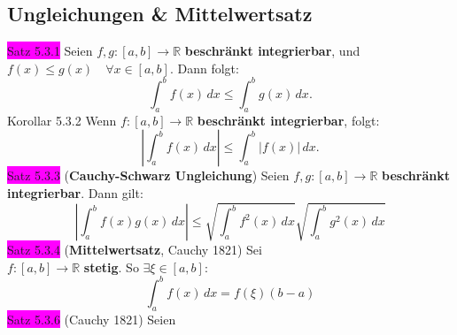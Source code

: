 \documentclass[landscape, 10pt]{article}
\newcommand{\R}{\mathbb{R}}
\begin{document}
\begin{multicols}{3}
       \subsection{Ungleichungen \& Mittelwertsatz}
              \colorbox{magenta}{Satz 5.3.1} 
                     Seien \textcolor{NavyBlue}{
                     $f,g:[a,b]\longrightarrow\R$}
                     \textbf{beschränkt integrierbar}, und 
                     \textcolor{NavyBlue}{
                     $f(x)\leqslant g(x)\quad\forall x\in[a,b]$}.
                     Dann folgt: 
                     \begin{equation*}
                            \int_a^bf(x)\,dx
                            \leqslant\int_a^bg(x)\,dx.
                     \end{equation*}
              \colorbox{BurntOrange}{Korollar 5.3.2} 
                     Wenn \textcolor{NavyBlue}{
                     $f:[a,b]\longrightarrow\R$} 
                     \textbf{beschränkt integrierbar}, folgt:
                     \begin{equation*}
                            |\int_a^bf(x)\,dx|
                            \leqslant\int_a^b|f(x)|\,dx. 
                     \end{equation*}
              \colorbox{magenta}{Satz 5.3.3} 
              (\textbf{Cauchy-Schwarz Ungleichung}) 
                     Seien \textcolor{NavyBlue}{
                     $f,g:[a,b]\longrightarrow\R$}
                     \textbf{beschränkt integrierbar}. 
                     Dann gilt: 
                     \begin{equation*}
                            |\int_a^bf(x)g(x)\,dx|
                            \leqslant\sqrt{\int_a^bf^2(x)\,dx}
                            \sqrt{\int_a^bg^2(x)\,dx}
                     \end{equation*}
              \colorbox{magenta}{Satz 5.3.4} 
              (\textbf{Mittelwertsatz}, Cauchy 1821) 
                     Sei \\ \textcolor{NavyBlue}{
                     $f:[a,b]\longrightarrow\R$} 
                     \textbf{stetig}. So 
                     \textcolor{NavyBlue}{
                     $\exists\xi\in[a,b]$}:
                     \begin{equation*}
                            \int_a^bf(x)\,dx=f(\xi)(b-a)
                     \end{equation*}
              \colorbox{magenta}{Satz 5.3.6} 
              (Cauchy 1821) 
                     Seien \textcolor{NavyBlue}{
}
\end{multicols}
\end{document}

